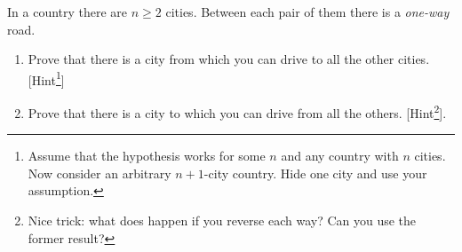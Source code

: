 \begin{exercise}
	In a country there are $n\ge 2$ cities. Between each pair of them there is a \textit{one-way} road.
	\begin{enumerate}
		\item Prove that there is a city from which you can drive to all the other cities. [Hint\footnote{Assume that the hypothesis works for some $n$ and any
			country with $n$ cities. Now consider an arbitrary $n+1$-city country. Hide one city and use your assumption.}]
		\item Prove that there is a city to which you can drive from all the others. [Hint\footnote{Nice trick: what does happen if you reverse each way? Can you use the former result?}].
	\end{enumerate}
\end{exercise}
